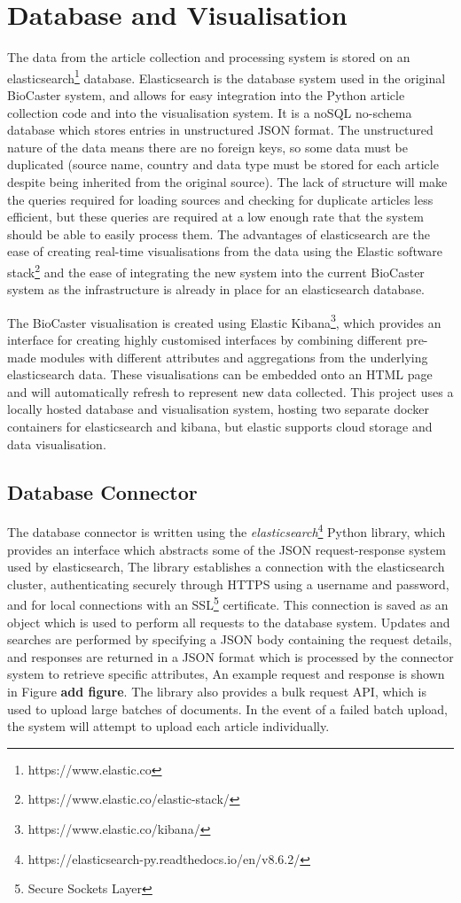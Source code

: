 \documentclass{l4proj}
\begin{document}
\section{Database and Visualisation}
The data from the article collection and processing system is stored on an elasticsearch\footnote{https://www.elastic.co} database. Elasticsearch is the database system used in the original BioCaster system, and allows for easy integration into the Python article collection code and into the visualisation system. It is a noSQL no-schema database which stores entries in unstructured JSON format. The unstructured nature of the data means there are no foreign keys, so some data must be duplicated (source name, country and data type must be stored for each article despite being inherited from the original source). The lack of structure will make the queries required for loading sources and checking for duplicate articles less efficient, but these queries are required at a low enough rate that the system should be able to easily process them. The advantages of elasticsearch are the ease of creating real-time visualisations from the data using the Elastic software stack\footnote{https://www.elastic.co/elastic-stack/} and the ease of integrating the new system into the current BioCaster system as the infrastructure is already in place for an elasticsearch database.\par
The BioCaster visualisation is created using Elastic Kibana\footnote{https://www.elastic.co/kibana/}, which provides an interface for creating highly customised interfaces by combining different pre-made modules with different attributes and aggregations from the underlying elasticsearch data. These visualisations can be embedded onto an HTML page and will automatically refresh to represent new data collected. This project uses a locally hosted database and visualisation system, hosting two separate docker containers for elasticsearch and kibana, but elastic supports cloud storage and data visualisation. 

\subsection{Database Connector}
The database connector is written using the \emph{elasticsearch}\footnote{https://elasticsearch-py.readthedocs.io/en/v8.6.2/} Python library, which provides an interface which abstracts some of the JSON request-response system used by elasticsearch, The library establishes a connection with the elasticsearch cluster, authenticating securely through HTTPS using a username and password, and for local connections with an SSL\footnote{Secure Sockets Layer} certificate. This connection is saved as an object which is used to perform all requests to the database system. Updates and searches are performed by specifying a JSON body containing the request details, and responses are returned in a JSON format which is processed by the connector system to retrieve specific attributes, An example request and response is shown in Figure \textbf{add figure}. The library also provides a bulk request API, which is used to upload large batches of documents. In the event of a failed batch upload, the system will attempt to upload each article individually.
\end{document}

